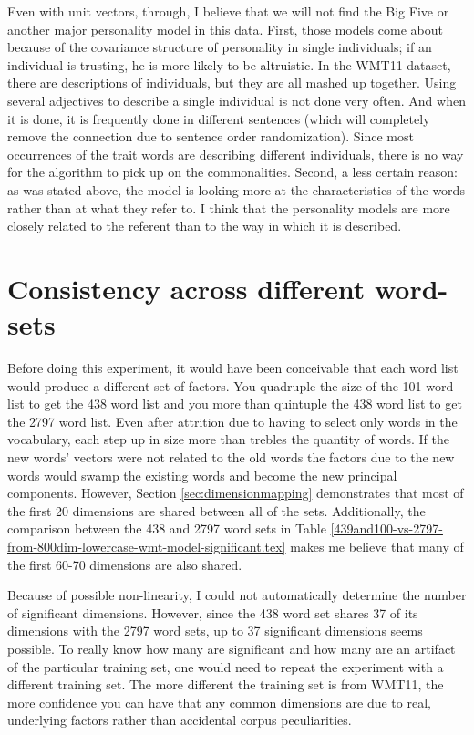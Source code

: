 Even with unit vectors, through, I believe that we will not find the Big Five or 
another major personality model in this data. First, those models come about 
because of the covariance structure of personality in single individuals; if an 
individual is trusting, he is more likely to be altruistic. In the WMT11 
dataset, there are descriptions of individuals, but they are all mashed up 
together. Using several adjectives to describe a single individual is not done 
very often. And when it is done, it is frequently done in different sentences 
(which will completely remove the connection due to sentence order 
randomization). Since most occurrences of the trait words are describing 
different individuals, there is no way for the algorithm to pick up on the 
commonalities. Second, a less certain reason: as was stated above, the model is 
looking more at the characteristics of the words rather than at what they refer 
to. I think that the personality models are more closely related to the referent 
than to the way in which it is described.

\section{Consistency across different word-sets}

Before doing this experiment, it would have been conceivable that each word list
would produce a different set of factors. You quadruple the size of the 101
word list to get the 438 word list and you more than quintuple the 438 word list
to get the 2797 word list. Even after attrition due to having to select only 
words in the vocabulary, each step up in size more than trebles the quantity of
words. If the new words' vectors were not related to the old words the factors
due to the new words would swamp the existing words and become the new principal
components. However, Section \ref{sec:dimensionmapping} demonstrates 
that most of the first 20 dimensions are shared between all of the sets. 
Additionally, the comparison between the 438 and 2797 word sets in Table 
\ref{439and100-vs-2797-from-800dim-lowercase-wmt-model-significant.tex} makes
me believe that many of the first 60-70 dimensions are also shared.

Because of possible non-linearity, I could not automatically determine the 
number of significant dimensions. However, since the 438 word set shares 37 of
its dimensions with the 2797 word sets, up to 37 significant dimensions seems 
possible. To really know how many are significant and how many are an artifact
of the particular training set, one would need to repeat the experiment with 
a different training set. The more different the training set is from WMT11, 
the more confidence you can have that any common dimensions are due to real,
underlying factors rather than accidental corpus peculiarities.


